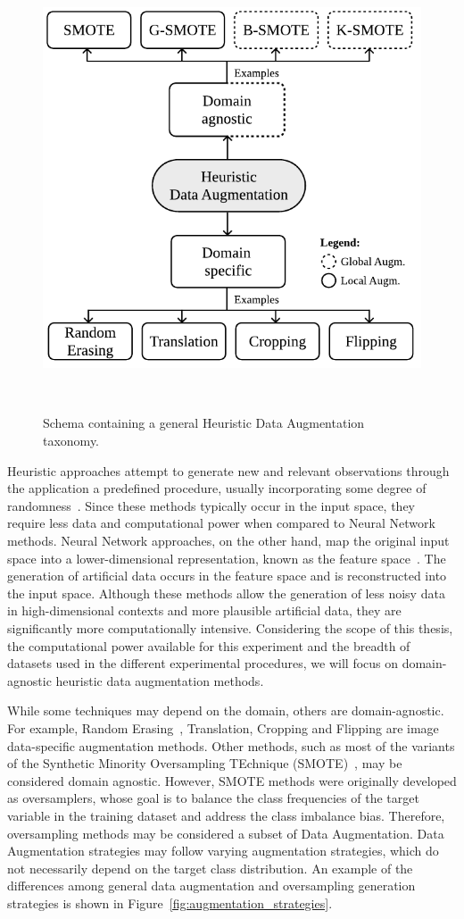 \begin{figure}[ht]
	\centering
	\includegraphics[width=.5\linewidth]{data_augmentation_taxonomy}
    \caption{%
        Schema containing a general Heuristic Data Augmentation taxonomy.
    }~\label{fig:data_augmentation_taxonomy}
\end{figure}

Heuristic approaches attempt to generate new and relevant observations through
the application a predefined procedure, usually incorporating some degree of
randomness~\cite{Kashefi2020}. Since these methods typically occur in the
input space, they require less data and computational power when compared to
Neural Network methods. Neural Network approaches, on the other hand, map the
original input space into a lower-dimensional representation, known as the
feature space~\cite{DeVries2017}. The generation of artificial data occurs in
the feature space and is reconstructed into the input space. Although these
methods allow the generation of less noisy data in high-dimensional contexts
and more plausible artificial data, they are significantly more
computationally intensive. Considering the scope of this thesis, the
computational power available for this experiment and the breadth of datasets
used in the different experimental procedures, we will focus on
domain-agnostic heuristic data augmentation methods.

While some techniques may depend on the domain, others are domain-agnostic.
For example, Random Erasing~\cite{Zhong2020}, Translation, Cropping and
Flipping are image data-specific augmentation methods. Other methods, such as
most of the variants of the Synthetic Minority Oversampling TEchnique
(SMOTE)~\cite{Chawla2002}, may be considered domain agnostic. However, SMOTE
methods were originally developed as oversamplers, whose goal is to balance
the class frequencies of the target variable in the training dataset and
address the class imbalance bias. Therefore, oversampling methods may be
considered a subset of Data Augmentation. Data Augmentation strategies may
follow varying augmentation strategies, which do not necessarily depend on
the target class distribution. An example of the differences among general
data augmentation and oversampling generation strategies is shown in
Figure~\ref{fig:augmentation_strategies}.

